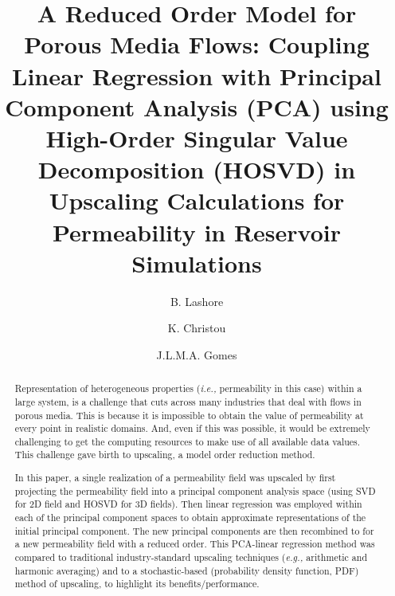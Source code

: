 \documentclass[preprint,12pt]{elsarticle}
\newcommand{\eg}{{\it e.g., }}
\newcommand{\ie}{{\it i.e., }}
\begin{document}
\begin{frontmatter}



\title{A Reduced Order Model for Porous Media Flows: Coupling Linear Regression with Principal Component Analysis (PCA) using High-Order Singular Value Decomposition (HOSVD) in Upscaling Calculations for Permeability in Reservoir Simulations}
\author[UoA]{B. Lashore} \author[UoA]{K. Christou} \author[UoA]{J.L.M.A. Gomes}
\address[UoA]{Mechanics of Fluids, Soils \& Structures Research Group \\ School of Engineering, University of Aberdeen, UK}


\begin{abstract}

Representation of heterogeneous properties (\ie permeability in this case) within a large system, is a challenge that cuts across many industries that deal with flows in porous media. This is because it is impossible to obtain the value of permeability at every point in realistic domains. And, even if this was possible, it would be extremely challenging to get the computing resources to make use of all available data values. This challenge gave birth to upscaling, a model order reduction method.

In this paper, a single realization of a permeability field was upscaled by first projecting the permeability field into a principal component analysis space (using SVD for 2D field and HOSVD for 3D fields). Then linear regression was employed within each of the principal component spaces to obtain approximate representations of the initial principal component. The new principal components are then recombined to for a new permeability field with a reduced order. This PCA-linear regression method was compared to traditional industry-standard upscaling techniques (\eg arithmetic and harmonic averaging) and to a stochastic-based (probability density function, PDF) method of upscaling, to highlight its benefits/performance.


\end{abstract}
\end{frontmatter}
\end{document}
